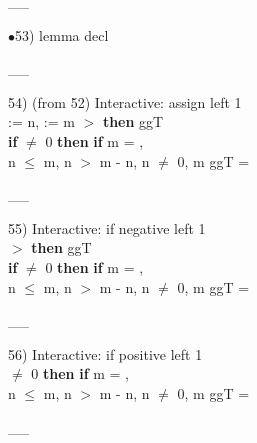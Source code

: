 \documentclass[a4paper]{article}
\begin{document}
\vspace{-1.5ex}\_\hrulefill \_

$\bullet$53) lemma decl \\
 \Fol 

\vspace{-1.5ex}\_\hrulefill \_

54)  (from 52) Interactive: assign left  1\\
\tabf \Do {} := n,  := m\Dc
{}  $>$  {\bf then} ggT \\
 \tabf \tabudo{}\tabudc{} {\bf if}  $\neq$ 0 {\bf then} {\bf if}  %
m = , \\
 \tabf n $\le$ m, \Not n $>$ m - n, n $\neq$ 0, m %
\Fol \Do ggT\Dc {} = 

\vspace{-1.5ex}\_\hrulefill \_

55) Interactive: if negative left  1\\
\tabf {}  $>$  {\bf then} ggT \\
 \tabf {} {\bf if}  $\neq$ 0 {\bf then} {\bf if}  %
m = , \\
 \tabf n $\le$ m, \Not n $>$ m - n, n $\neq$ 0, m %
\Fol \Do ggT\Dc {} = 

\vspace{-1.5ex}\_\hrulefill \_

56) Interactive: if positive left  1\\
\tabf {}  $\neq$ 0 {\bf then} {\bf if}  %
m = , \\
 \tabf n $\le$ m, \Not n $>$ m - n, n $\neq$ 0, m %
\Fol \Do ggT\Dc {} = 

\vspace{-1.5ex}\_\hrulefill \_
\end{document}
